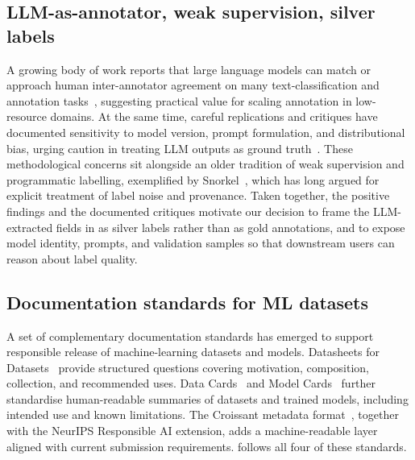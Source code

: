 \subsection{LLM-as-annotator, weak supervision, silver labels}
\label{sec:related:llm-annotator}

A growing body of work reports that large language models can match or approach human inter-annotator agreement on many text-classification and annotation tasks~\citep{gilardi2023chatgpt,ziems2024can,pangakis2023automated,chiang2023llmhumaneval}, suggesting practical value for scaling annotation in low-resource domains. At the same time, careful replications and critiques have documented sensitivity to model version, prompt formulation, and distributional bias, urging caution in treating LLM outputs as ground truth~\citep{reiss2023testing,pangakis2023automated}. These methodological concerns sit alongside an older tradition of weak supervision and programmatic labelling, exemplified by Snorkel~\citep{ratner2017snorkel}, which has long argued for explicit treatment of label noise and provenance. Taken together, the positive findings and the documented critiques motivate our decision to frame the LLM-extracted fields in \juddgespl{} as silver labels rather than as gold annotations, and to expose model identity, prompts, and validation samples so that downstream users can reason about label quality.

\subsection{Documentation standards for ML datasets}
\label{sec:related:documentation}

A set of complementary documentation standards has emerged to support responsible release of machine-learning datasets and models. Datasheets for Datasets~\citep{gebru2021datasheets} provide structured questions covering motivation, composition, collection, and recommended uses. Data Cards~\citep{pushkarna2022data} and Model Cards~\citep{mitchell2019model} further standardise human-readable summaries of datasets and trained models, including intended use and known limitations. The Croissant metadata format~\citep{akhtar2024croissant}, together with the NeurIPS Responsible AI extension, adds a machine-readable layer aligned with current submission requirements. \juddgespl{} follows all four of these standards.
